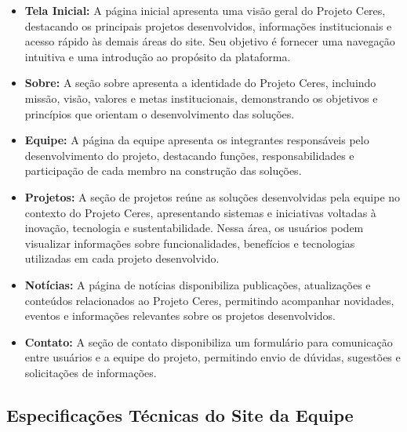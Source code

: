 \documentclass[11pt,a4paper]{article}
\begin{document}
\begin{itemize}
    \item \textbf{Tela Inicial:} A página inicial apresenta uma visão geral do Projeto Ceres, destacando os principais projetos desenvolvidos, informações institucionais e acesso rápido às demais áreas do site. Seu objetivo é fornecer uma navegação intuitiva e uma introdução ao propósito da plataforma.
    \item \textbf{Sobre:} A seção sobre apresenta a identidade do Projeto Ceres, incluindo missão, visão, valores e metas institucionais, demonstrando os objetivos e princípios que orientam o desenvolvimento das soluções.
    \item \textbf{Equipe:} A página da equipe apresenta os integrantes responsáveis pelo desenvolvimento do projeto, destacando funções, responsabilidades e participação de cada membro na construção das soluções.
    \item \textbf{Projetos:} A seção de projetos reúne as soluções desenvolvidas pela equipe no contexto do Projeto Ceres, apresentando sistemas e iniciativas voltadas à inovação, tecnologia e sustentabilidade. Nessa área, os usuários podem visualizar informações sobre funcionalidades, benefícios e tecnologias utilizadas em cada projeto desenvolvido.
    \item \textbf{Notícias:} A página de notícias disponibiliza publicações, atualizações e conteúdos relacionados ao Projeto Ceres, permitindo acompanhar novidades, eventos e informações relevantes sobre os projetos desenvolvidos.
    \item \textbf{Contato:} A seção de contato disponibiliza um formulário para comunicação entre usuários e a equipe do projeto, permitindo envio de dúvidas, sugestões e solicitações de informações.
\end{itemize}

\subsection{Especificações Técnicas do Site da Equipe}
\end{document}
